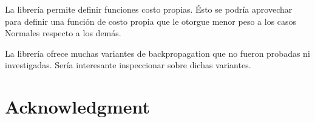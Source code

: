 \documentclass[conference]{IEEEtran}
\theoremstyle{definition}
\begin{document}
La librería permite definir funciones costo propias. Ésto se podría aprovechar para definir una función de costo propia que le otorgue menor peso a los casos Normales respecto a los demás.

La librería ofrece muchas variantes de backpropagation que no fueron probadas ni investigadas. Sería interesante inspeccionar sobre dichas variantes.

\IEEEpeerreviewmaketitle

\section*{Acknowledgment}

\newpage



\end{document}
